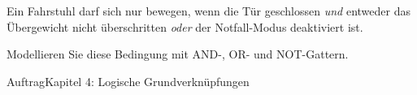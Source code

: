 \begin{frame}
\begin{center}
Ein Fahrstuhl darf sich nur bewegen, wenn die Tür geschlossen \emph{und} entweder das Übergewicht nicht überschritten \emph{oder} der Notfall-Modus deaktiviert ist.
\vspace{4mm}

Modellieren Sie diese Bedingung mit AND-, OR- und NOT-Gattern.
\end{center}
\end{frame}

\begin{frame}{Auftrag}{Kapitel 4: Logische Grundverknüpfungen}
\end{frame}
